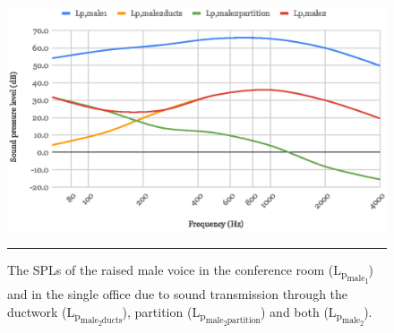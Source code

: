 \begin{figure}[htbp]
	\centering
	\includegraphics[width=\textwidth]{figures/Lpmale.eps}
	\rule{\textwidth}{0.5pt} %
	\caption{The SPLs of the raised male voice in the conference room (L\textsubscript{p\textsubscript{male\textsubscript{1}}}) and in the single office due to sound transmission through the ductwork (L\textsubscript{p\textsubscript{male\textsubscript{2}ducts}}), partition (L\textsubscript{p\textsubscript{male\textsubscript{2}partition}}) and both (L\textsubscript{p\textsubscript{male\textsubscript{2}}}).}
	\label{fig:Lpmale}
\end{figure}